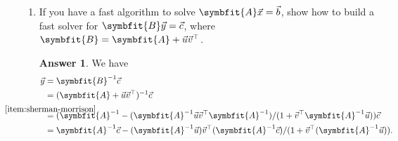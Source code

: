 \documentclass{article}
\theoremstyle{definition}
\newtheorem*{answer}{Answer}
\newcommand{\mat}[1]{\symbfit{#1}}
\begin{document}
\begin{enumerate}[leftmargin=\labelsep]
\begin{enumerate}
\begin{proof}
\begin{alignat*}{4}
				                     &  &         & = (\mat{A} + \mat{U}\mat{V}^\top)(\mat{A}^{-1} - \mat{A}^{-1} \mat{U}\mat{B} \mat{V}^\top \mat{A}^{-1})                                                                                                                       \\
				                     &  &         & = \cancelto{\mat{I}}{\mat{A}\mat{A}^{-1}} - \cancel{\mat{A}\mat{A}^{-1}}\mat{U}\mat{B} \mat{V}^\top \mat{A}^{-1} + \mat{U}\mat{V}^\top\mat{A}^{-1} - \mat{U}\mat{V}^\top\mat{A}^{-1} \mat{U}\mat{B} \mat{V}^\top \mat{A}^{-1} \\
				            \implies &  & \mat{0} & = \mat{U}(- \mat{B} + \mat{I} - \mat{V}^\top\mat{A}^{-1} \mat{U}\mat{B} )\mat{V}^\top \mat{A}^{-1}                                                                                                                            \\
				            \implies &  & \mat{0} & = \mat{I} - \underbrace{(\mat{I} + \mat{V}^\top\mat{A}^{-1} \mat{U})}_{\mat{T}}\mat{B}                                                                                                                                        \\
				            \implies &  & \mat{I} & = \mat{T}\mat{B},
			            \end{alignat*}
			            therefore \(\mat{T}\) is invertible and non-singular, and \(\mat{B} = \mat{T}^{-1}\).
		            \end{proof}

		      \item If you have a fast algorithm to solve \(\mat{A}\vec{x} = \vec{b}\), show how to build a fast solver for \(\mat{B}\vec{y} = \vec{c}\), where \(\mat{B} = \mat{A} + \vec{u}\vec{v}^\top\).
		            \begin{answer}
			            We have
			            \begin{align*}
				            \vec{y} & = \mat{B}^{-1} \vec{c}                                                                                                                                              \\
				                    & = (\mat{A} + \vec{u}\vec{v}^\top)^{-1} \vec{c}                                                                                                                      \\
				                    & \stackrel{\mathclap{\ref{item:sherman-morrison}}}{=} (\mat{A}^{-1} - (\mat{A}^{-1}\vec{u}\vec{v}^\top\mat{A}^{-1})/(1 + \vec{v}^\top \mat{A}^{-1} \vec{u})) \vec{c} \\
				                    & = \mat{A}^{-1}\vec{c} - (\mat{A}^{-1}\vec{u})\vec{v}^\top(\mat{A}^{-1}\vec{c})/(1 + \vec{v}^\top (\mat{A}^{-1} \vec{u})).
			            \end{align*}


\end{answer}
\end{enumerate}
\end{enumerate}
\end{document}
